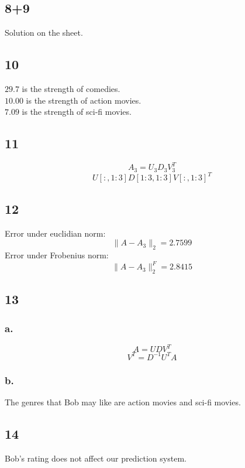 \documentclass{article}
\begin{document}
\subsection{8+9}
Solution on the sheet.

\subsection{10}
$29.7$ is the strength of comedies.\\
$10.00$ is the strength of action movies.\\
$7.09$ is the strength of sci-fi movies.

\subsection{11}
$$A_3 = U_3D_3V^T_3$$
$$U[:,1:3]D[1:3, 1:3]V[:,1:3]^T$$

\subsection{12}
Error under euclidian norm: 
$$\|A - A_3\|_2 = 2.7599$$
Error under Frobenius norm:
$$\|A - A_3\|_2^F = 2.8415$$

\subsection{13}
\subsubsection{a.}
$$A = UDV^T$$
$$V^T = D^{-1}U^TA$$
\subsubsection{b.}
The genres that Bob may like are action movies and sci-fi movies.
\subsection{14}
Bob's rating does not affect our prediction system.
\end{document}
